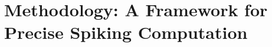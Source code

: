 \documentclass{article}
\theoremstyle{plain}
\theoremstyle{definition}
\theoremstyle{remark}
\begin{document}
\section{Methodology: A Framework for Precise Spiking Computation}
\label{sec:methodology}



\end{document}
